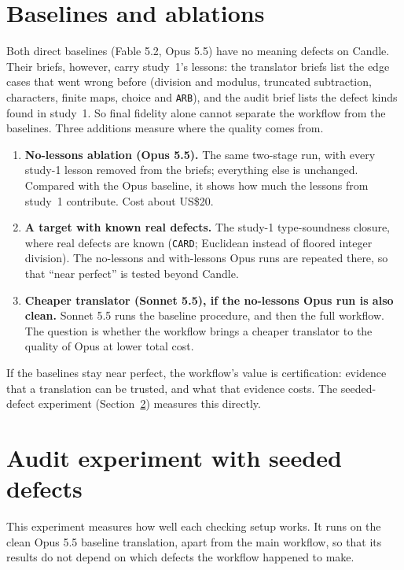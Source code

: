 \documentclass[11pt,a4paper]{article}
\newcommand{\code}[1]{\texttt{#1}}
\begin{document}
\section{Baselines and ablations}\label{sec:ablation}
Both direct baselines (Fable 5.2, Opus 5.5) have no meaning defects on Candle. Their briefs, however, carry study~1's lessons: the translator briefs list the edge cases that went wrong before (division and modulus, truncated subtraction, characters, finite maps, choice and \code{ARB}), and the audit brief lists the defect kinds found in study~1. So final fidelity alone cannot separate the workflow from the baselines. Three additions measure where the quality comes from.
\begin{enumerate}
\item \textbf{No-lessons ablation (Opus 5.5).} The same two-stage run, with every study-1 lesson removed from the briefs; everything else is unchanged. Compared with the Opus baseline, it shows how much the lessons from study~1 contribute. Cost about US\$20.
\item \textbf{A target with known real defects.} The study-1 type-soundness closure, where real defects are known (\code{CARD}; Euclidean instead of floored integer division). The no-lessons and with-lessons Opus runs are repeated there, so that ``near perfect'' is tested beyond Candle.
\item \textbf{Cheaper translator (Sonnet 5.5), if the no-lessons Opus run is also clean.} Sonnet 5.5 runs the baseline procedure, and then the full workflow. The question is whether the workflow brings a cheaper translator to the quality of Opus at lower total cost.
\end{enumerate}
If the baselines stay near perfect, the workflow's value is certification: evidence that a translation can be trusted, and what that evidence costs. The seeded-defect experiment (Section~\ref{sec:audit}) measures this directly.

\section{Audit experiment with seeded defects}\label{sec:audit}
This experiment measures how well each checking setup works. It runs on the clean Opus 5.5 baseline translation, apart from the main workflow, so that its results do not depend on which defects the workflow happened to make.
\end{document}
